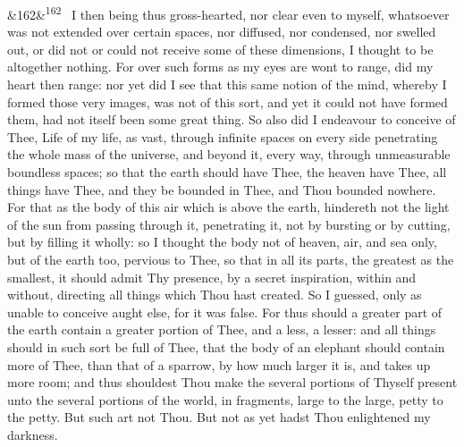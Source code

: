 \documentclass[12pt]{article}
\newcommand{\para}[1][]{\par\noindent\ifx&#1&\else\textsuperscript{\footnotesize #1}~\fi}
\begin{document}
\para[162] I then being thus gross-hearted, nor clear even to myself, whatsoever was not extended over certain spaces, nor diffused, nor condensed, nor swelled out, or did not or could not receive some of these dimensions, I thought to be altogether nothing. For over such forms as my eyes are wont to range, did my heart then range: nor yet did I see that this same notion of the mind, whereby I formed those very images, was not of this sort, and yet it could not have formed them, had not itself been some great thing. So also did I endeavour to conceive of Thee, Life of my life, as vast, through infinite spaces on every side penetrating the whole mass of the universe, and beyond it, every way, through unmeasurable boundless spaces; so that the earth should have Thee, the heaven have Thee, all things have Thee, and they be bounded in Thee, and Thou bounded nowhere. For that as the body of this air which is above the earth, hindereth not the light of the sun from passing through it, penetrating it, not by bursting or by cutting, but by filling it wholly: so I thought the body not of heaven, air, and sea only, but of the earth too, pervious to Thee, so that in all its parts, the greatest as the smallest, it should admit Thy presence, by a secret inspiration, within and without, directing all things which Thou hast created. So I guessed, only as unable to conceive aught else, for it was false. For thus should a greater part of the earth contain a greater portion of Thee, and a less, a lesser: and all things should in such sort be full of Thee, that the body of an elephant should contain more of Thee, than that of a sparrow, by how much larger it is, and takes up more room; and thus shouldest Thou make the several portions of Thyself present unto the several portions of the world, in fragments, large to the large, petty to the petty. But such art not Thou. But not as yet hadst Thou enlightened my darkness.
\end{document}

